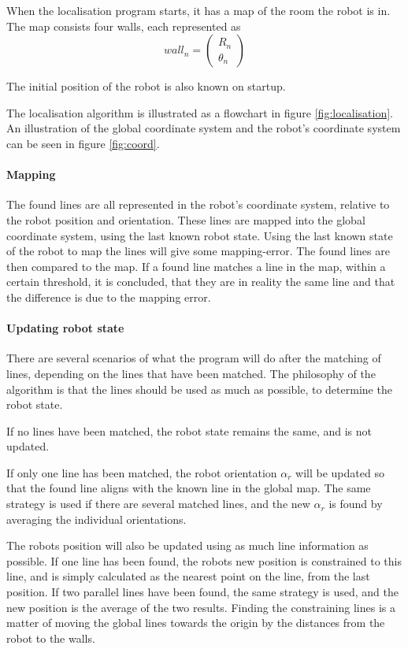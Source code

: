 When the localisation program starts, it has a map of the room the robot is in.
The map consists four walls, each represented as 
$$wall_n = \begin{pmatrix}
R_n\\
\theta_n
\end{pmatrix}
$$

The initial position of the robot is also known on startup.

The localisation algorithm is illustrated as a flowchart in figure \ref{fig:localisation}.
An illustration of the global coordinate system and the robot's coordinate system can be seen 
in figure \ref{fig:coord}.

\paragraph*{Mapping}
The found lines are all represented in the robot's coordinate system, relative to the robot position and orientation.
These lines are mapped into the global coordinate system, using the last known robot state. Using 
the last known state of the robot to map the lines will give some mapping-error.
The found lines are then compared to the map. If a found line matches a line 
in the map, within a certain threshold, it is concluded, that they are in 
reality the same line and that the difference is due to the mapping error.

\paragraph*{Updating robot state}
There are several scenarios of what the program will do after the matching of lines,
depending on the lines that have been matched.
The philosophy of the algorithm is that the lines should be used as much as possible,
to determine the robot state.

If no lines have been matched, the robot state remains the same, and is not updated.

If only one line has been matched, the robot orientation \(\alpha_r\) will be updated
so that the found line aligns with the known line in the global map.
The same strategy is used if there are several matched lines, and the new \(\alpha_r\) is
found by averaging the individual orientations.

The robots position will also be updated using as much line information as possible.
If one line has been found, the robots new position is constrained to this line,
and is simply calculated as the nearest point on the line, from the last position.
If two parallel lines have been found, the same strategy is used, and the new position is the average of the two results.
Finding the constraining lines is a matter of moving the global lines towards the origin
by the distances from the robot to the walls.

